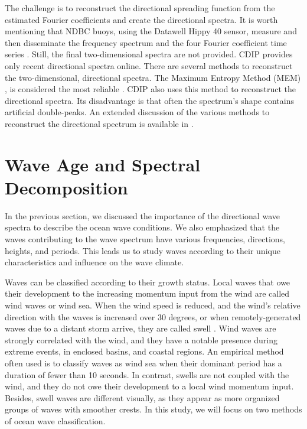 The challenge is to reconstruct the directional spreading function from the estimated Fourier coefficients and create the directional spectra. It is worth mentioning that NDBC buoys, using the Datawell Hippy 40 sensor, measure and then disseminate the frequency spectrum and the four Fourier coefficient time series \cite{Steele1998}. Still, the final two-dimensional spectra are not provided. CDIP provides only recent directional spectra online. There are several methods to reconstruct the two-dimensional, directional spectra. The Maximum Entropy Method (MEM) \cite{Lygre1986}, is considered the most reliable \cite{Ardhuin2019a}. CDIP also uses this method to reconstruct the directional spectra. Its disadvantage is that often the spectrum's shape contains artificial double-peaks. An extended discussion of the various methods to reconstruct the directional spectrum is available in \cite{Earle1999, Goda2010c, Young1999a}.




\section{Wave Age and Spectral Decomposition}\label{decomposition_waveage}


In the previous section, we discussed the importance of the directional wave spectra to describe the ocean wave conditions. We also emphasized that the waves contributing to the wave spectrum have various frequencies, directions, heights, and periods. This leads us to study waves according to their unique characteristics and influence on the wave climate. 

Waves can be classified according to their growth status. Local waves that owe their development to the increasing momentum input from the wind are called wind waves or wind sea. When the wind speed is reduced, and the wind's relative direction with the waves is increased over 30 degrees, or when remotely-generated waves due to a distant storm arrive, they are called swell \cite{Organization1998a}. Wind waves  are strongly correlated with the wind, and they have a notable presence during extreme events, in enclosed basins, and coastal regions. An empirical method often used is to classify waves as wind sea when their dominant period has a duration of fewer than 10 seconds. In contrast, swells are not coupled with the wind, and they do not owe their development to a local wind momentum input. Besides, swell waves are different visually, as they appear as more organized groups of waves with smoother crests. In this study, we will focus on two methods of ocean wave classification.

